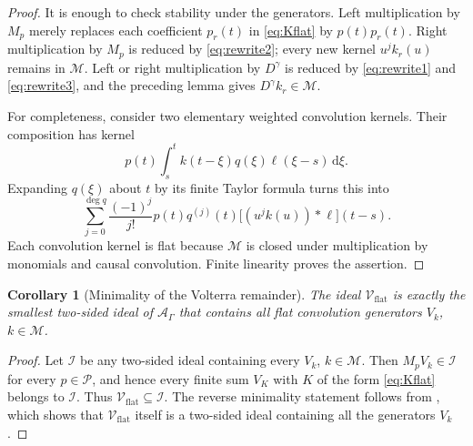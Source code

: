 \documentclass[11pt]{article}
\numberwithin{equation}{section}
\newtheorem{corollary}{Corollary}
\theoremstyle{definition}
\theoremstyle{remark}
\newcommand{\M}{\mathcal M}
\newcommand{\A}{\mathcal A}
\newcommand{\Pcal}{\mathcal P}
\newcommand{\Vflat}{\mathcal V_{\mathrm{flat}}}
\newcommand{\dd}{\,\mathrm d}
\begin{document}
\begin{proof}
It is enough to check stability under the generators. Left multiplication by $M_p$ merely replaces each coefficient $p_r(t)$ in \eqref{eq:Kflat} by $p(t)p_r(t)$. Right multiplication by $M_p$ is reduced by \eqref{eq:rewrite2}; every new kernel $u^jk_r(u)$ remains in $\M$. Left or right multiplication by $D^\gamma$ is reduced by \eqref{eq:rewrite1} and \eqref{eq:rewrite3}, and the preceding lemma gives $D^\gamma k_r\in\M$.

For completeness, consider two elementary weighted convolution kernels. Their composition has kernel
\begin{equation*}
p(t)\int_s^t k(t-\xi)q(\xi)\ell(\xi-s)\dd\xi.
\end{equation*}
Expanding $q(\xi)$ about $t$ by its finite Taylor formula turns this into
\begin{equation*}
\sum_{j=0}^{\deg q}\frac{(-1)^j}{j!}p(t)q^{(j)}(t)
\big[(u^jk(u))*\ell\big](t-s).
\end{equation*}
Each convolution kernel is flat because $\M$ is closed under multiplication by monomials and causal convolution. Finite linearity proves the assertion.
\end{proof}

\begin{corollary}[Minimality of the Volterra remainder]\label{cor:minimal-ideal}
The ideal $\Vflat$ is exactly the smallest two-sided ideal of $\A_\Gamma$
that contains all flat convolution generators $V_k$, $k\in\M$.
\end{corollary}

\begin{proof}
Let $\mathcal I$ be any two-sided ideal containing every $V_k$, $k\in\M$.
Then $M_pV_k\in\mathcal I$ for every $p\in\Pcal$, and hence every finite
sum $V_K$ with $K$ of the form \eqref{eq:Kflat} belongs to $\mathcal I$.
Thus $\Vflat\subseteq\mathcal I$. The reverse minimality statement follows
from , which shows that $\Vflat$ itself is a two-sided ideal
containing all the generators $V_k$.
\end{proof}
\end{document}

